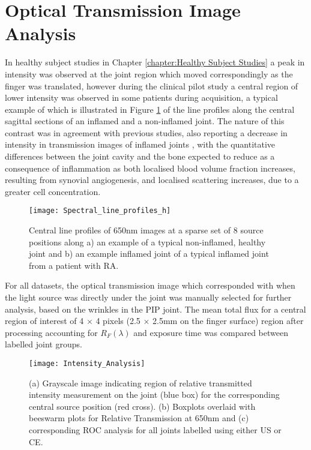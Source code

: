 \documentclass[twoside]{bhamthesis}
\theoremstyle{definition}
\begin{document}
\section{Optical Transmission Image Analysis}
\label{chapter:Optical Transmission Image Analysis}

In healthy subject studies in Chapter \ref{chapter:Healthy Subject Studies} a peak in intensity was observed at the joint region which moved correspondingly as the finger was translated, however during the clinical pilot study a central region of lower intensity was observed in some patients during acquisition, a typical example of which is illustrated in Figure \ref{fig:Spectral_line_profiles_h} of the line profiles along the central sagittal sections of an inflamed and a non-inflamed joint. The nature of this contrast was in agreement with previous studies, also reporting a decrease in intensity in transmission images of inflamed joints \cite{hielscher2003assessment}, with the quantitative differences between the joint cavity and the bone expected to reduce as a consequence of inflammation as both localised blood volume fraction increases, resulting from synovial angiogenesis, and localised scattering increases, due to a greater cell concentration.

\begin{figure}[!ht]
\centering\texttt{[image: Spectral\_line\_profiles\_h]}\caption{Central line profiles of 650nm images at a sparse set of 8 source positions along a) an example of a typical non-inflamed, healthy joint and b) an example inflamed joint of a typical inflamed joint from a patient with RA.}
\label{fig:Spectral_line_profiles_h}
\end{figure}

For all datasets, the optical transmission image which corresponded with when the light source was directly under the joint was manually selected for further analysis, based on the wrinkles in the PIP joint. The mean total flux for a central region of interest of 4 $\times$ 4 pixels (2.5 $\times$ 2.5mm on the finger surface) region after processing accounting for $R_F(\lambda)$ and exposure time  was compared between labelled joint groups. 

\begin{figure}[!ht]
\centering\texttt{[image: Intensity\_Analysis]}\caption{ (a) Grayscale image indicating region of relative transmitted intensity measurement on the joint (blue box) for the corresponding central source position (red cross). (b) Boxplots overlaid with beeswarm plots for Relative Transmission at 650nm and (c) corresponding ROC analysis for all joints labelled using either US or CE.}
\label{fig:Intensity_Analysis}
\end{figure}
\end{document}
